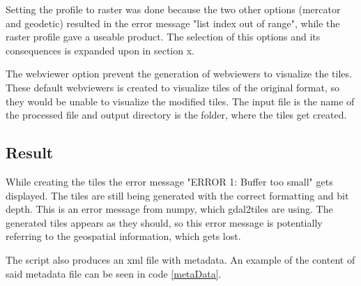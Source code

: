 Setting the profile to raster was done because the two other options (mercator and geodetic) resulted in the error message "list index out of range", while the raster profile gave a useable product. The selection of this options and its consequences is expanded upon in section x.  

The webviewer option prevent the generation of webviewers to visualize the tiles. These default webviewers is created to visualize tiles of the original format, so they would be unable to visualize the modified tiles. 
The input file is the name of the processed file and output directory is the folder, where the tiles get created. 
\subsection{Result}

While creating the tiles the error message "ERROR 1: Buffer too small" gets displayed. The tiles are still being generated with the correct formatting and bit depth. This is an error message from numpy, which gdal2tiles are using. 
\citep{MoreThan8}
The generated tiles appears as they should, so this error message is potentially referring to the geospatial information, which gets lost.


The script also produces an xml file with metadata. An example of the content of said metadata file can be seen in code \ref{metaData}.

